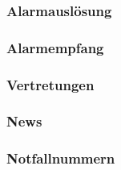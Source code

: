     \subsubsection{Alarmauslösung}
    \subsubsection{Alarmempfang}
    \subsubsection{Vertretungen}
    \subsubsection{News}
    \subsubsection{Notfallnummern}